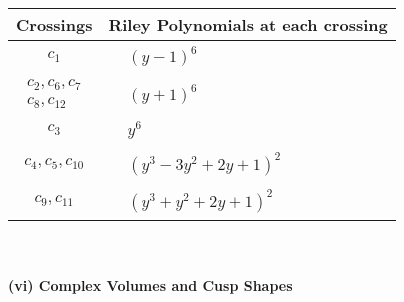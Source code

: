 \documentclass[1p]{elsarticle_modified}
\theoremstyle{definition}
\begin{document}
\begin{tabular}{m{50pt}|m{274pt}}
Crossings & \hspace{64pt}Riley Polynomials at each crossing \\
\hline $$\begin{aligned}c_{1}\end{aligned}$$&$\begin{aligned}
&(y-1)^6
\end{aligned}$\\
\hline $$\begin{aligned}c_{2},c_{6},c_{7}\\c_{8},c_{12}\end{aligned}$$&$\begin{aligned}
&(y+1)^6
\end{aligned}$\\
\hline $$\begin{aligned}c_{3}\end{aligned}$$&$\begin{aligned}
&y^6
\end{aligned}$\\
\hline $$\begin{aligned}c_{4},c_{5},c_{10}\end{aligned}$$&$\begin{aligned}
&(y^3-3 y^2+2 y+1)^2
\end{aligned}$\\
\hline $$\begin{aligned}c_{9},c_{11}\end{aligned}$$&$\begin{aligned}
&(y^3+y^2+2 y+1)^2
\end{aligned}$\\
\hline
\end{tabular}\\~\\
\newpage\flushleft \textbf{(vi) Complex Volumes and Cusp Shapes}
\end{document}
